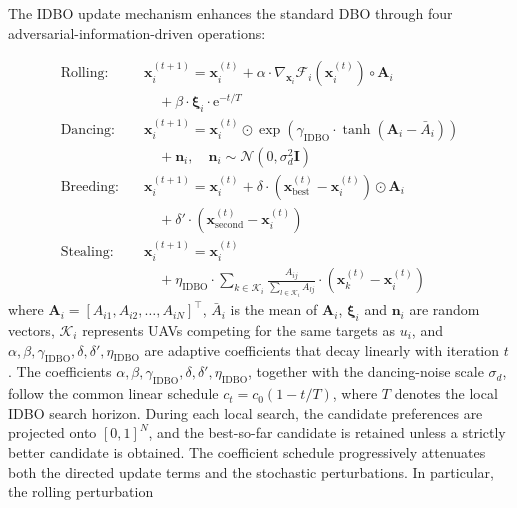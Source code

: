 \documentclass[lettersize,journal]{IEEEtran}
\begin{document}
The IDBO update mechanism enhances the standard DBO through four adversarial-information-driven operations:

\begin{align}
\text{Rolling:} \quad & \mathbf{x}_i^{(t+1)} = \mathbf{x}_i^{(t)} + \alpha \cdot \nabla_{\mathbf{x}_i} \mathcal{F}_i(\mathbf{x}_i^{(t)}) \circ \mathbf{A}_i \nonumber \\
& \quad + \beta \cdot \boldsymbol{\xi}_i \cdot \mathrm{e}^{-t/T} \label{eq:rolling_update} \\
\text{Dancing:} \quad & \mathbf{x}_i^{(t+1)} = \mathbf{x}_i^{(t)} \odot \exp\left(\gamma_{\mathrm{IDBO}} \cdot \tanh(\mathbf{A}_i - \bar{A}_i)\right) \nonumber \\
& \quad + \mathbf{n}_i, \quad \mathbf{n}_i \sim \mathcal{N}(0, \sigma_d^2 \mathbf{I}) \label{eq:dancing_update} \\
\text{Breeding:} \quad & \mathbf{x}_i^{(t+1)} = \mathbf{x}_i^{(t)} + \delta \cdot \left(\mathbf{x}_{\text{best}}^{(t)} - \mathbf{x}_i^{(t)}\right) \odot \mathbf{A}_i \nonumber \\
& \quad + \delta' \cdot \left(\mathbf{x}_{\text{second}}^{(t)} - \mathbf{x}_i^{(t)}\right) \label{eq:breeding_update} \\
\text{Stealing:} \quad & \mathbf{x}_i^{(t+1)} = \mathbf{x}_i^{(t)} \nonumber \\
& \quad + \eta_{\mathrm{IDBO}} \cdot \sum_{k \in \mathcal{K}_i} \frac{A_{ij}}{\sum_{l \in \mathcal{K}_i} A_{lj}} \cdot \left(\mathbf{x}_k^{(t)} - \mathbf{x}_i^{(t)}\right) \label{eq:stealing_update}
\end{align}
where $\mathbf{A}_i = [A_{i1}, A_{i2}, \dots, A_{iN}]^\top$, $\bar{A}_i$ is the mean of $\mathbf{A}_i$, $\boldsymbol{\xi}_i$ and $\mathbf{n}_i$ are random vectors, $\mathcal{K}_i$ represents UAVs competing for the same targets as $u_i$, and $\alpha, \beta, \gamma_{\mathrm{IDBO}}, \delta, \delta', \eta_{\mathrm{IDBO}}$ are adaptive coefficients that decay linearly with iteration $t$. 
The coefficients
$\alpha,\beta,\gamma_{\mathrm{IDBO}},\delta,\delta',
\eta_{\mathrm{IDBO}}$, together with the dancing-noise scale $\sigma_d$,
follow the common linear schedule $c_t=c_0(1-t/T)$, where $T$ denotes the
local IDBO search horizon. During each local search, the candidate
preferences are projected onto $[0,1]^N$, and the best-so-far candidate is
retained unless a strictly better candidate is obtained. The coefficient
schedule progressively attenuates both the directed update terms and the
stochastic perturbations. In particular, the rolling perturbation
\end{document}
